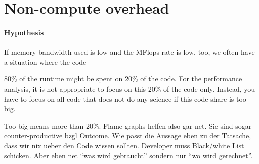 \section{Non-compute overhead}
\label{section:core:overhead}







\paragraph{Hypothesis}

If memory bandwidth used is low and the MFlops rate is low, too, we often have a
situation where the code 


\begin{assessmentcrime}
 80\% of the runtime might be spent on 20\% of the code.
 For the performance analysis, it is not appropriate to focus on this 20\% of
 the code only.
 Instead, you have to focus on all code that does not do any science if this
 code share is too big.
\end{assessmentcrime}

Too big means more than 20\%. Flame graphs helfen also gar net. Sie sind sogar
counter-productive bzgl Outcome. 
Wie passt die Aussage eben zu der Tatsache, dass wir nix ueber den Code wissen
sollten.
Developer muss Black/white List schicken.  Aber eben net ``was wird gebraucht''
sondern nur ``wo wird gerechnet''.
